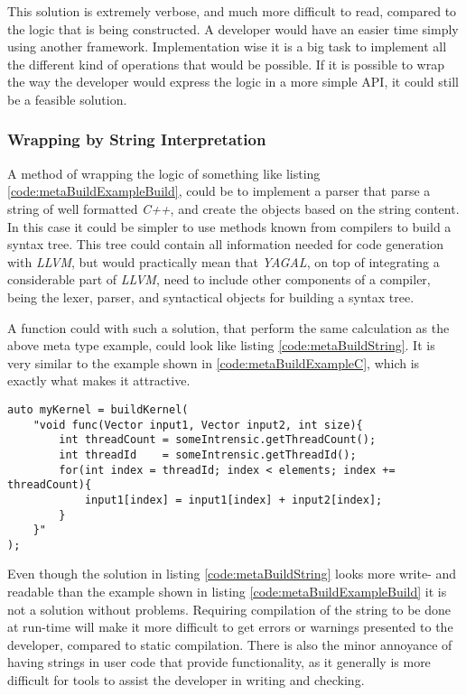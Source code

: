 This solution is extremely verbose, and much more difficult to read, compared to the logic that is being constructed. A developer would have an easier time simply using another framework. Implementation wise it is a big task to implement all the different kind of operations that would be possible. If it is possible to wrap the way the developer would express the logic in a more simple API, it could still be a feasible solution.

\subsubsection{Wrapping by String Interpretation}
A method of wrapping the logic of something like listing \ref{code:metaBuildExampleBuild}, could be to implement a parser that parse a string of well formatted \textit{C++}, and create the objects based on the string content. In this case it could be simpler to use methods known from compilers to build a syntax tree. This tree could contain all information needed for code generation with \textit{LLVM}, but would practically mean that \textit{YAGAL}, on top of integrating a considerable part of \textit{LLVM}, need to include other components of a compiler, being the lexer, parser, and syntactical objects for building a syntax tree.

A function could with such a solution, that perform the same calculation as the above meta type example, could look like listing \ref{code:metaBuildString}. It is very similar to the example shown in \ref{code:metaBuildExampleC}, which is exactly what makes it attractive. 

\begin{lstlisting}[caption={Code showing possible construction of kernel with string interpretation.}, label={code:metaBuildString}]
auto myKernel = buildKernel(
    "void func(Vector input1, Vector input2, int size){     
        int threadCount = someIntrensic.getThreadCount();
        int threadId    = someIntrensic.getThreadId();
        for(int index = threadId; index < elements; index += threadCount){
            input1[index] = input1[index] + input2[index];
        }
    }"
);
\end{lstlisting}

Even though the solution in listing \ref{code:metaBuildString} looks more write- and readable than the example shown in listing \ref{code:metaBuildExampleBuild} it is not a solution without problems. Requiring compilation of the string to be done at run-time will make it more difficult to get errors or warnings presented to the developer, compared to static compilation. There is also the minor annoyance of having strings in user code that provide functionality, as it generally is more difficult for tools to assist the developer in writing and checking.

